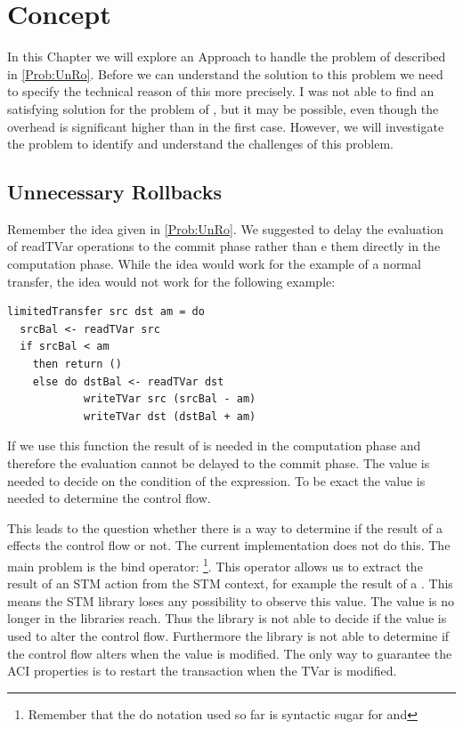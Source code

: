 
\chapter{Concept} %

\label{Chapter2} %

In this Chapter we will explore an Approach to handle the problem of  described in \ref{Prob:UnRo}.
Before we can understand the solution to this problem we need to specify the technical reason of this more precisely. 
I was not able to find an satisfying solution for the problem of , but it may 
be possible, even though the overhead is significant higher than in the first case. However, we will investigate 
the problem to identify and understand the challenges of this problem.

\section{Unnecessary Rollbacks}
Remember the idea given in \ref{Prob:UnRo}. We suggested to delay the evaluation of 
readTVar operations to the commit phase rather than e them directly in the computation
phase. While the idea would work for the example of a normal transfer, the idea would not work 
for the following example:
\begin{lstlisting}
limitedTransfer src dst am = do 
  srcBal <- readTVar src
  if srcBal < am
    then return ()
    else do dstBal <- readTVar dst
            writeTVar src (srcBal - am)
            writeTVar dst (dstBal + am)
\end{lstlisting}
If we use this function the result of  is needed in the computation phase and therefore 
the evaluation cannot be delayed to the commit phase. The value is needed to decide on the condition of the 
 expression. To be exact the value is needed to determine the control flow. 

This leads to the question whether there is a way to determine if the result of a  effects the 
control flow or not. The current implementation does not do this. The main problem is the bind
operator: \footnote{Remember that the do notation used so far is 
syntactic sugar for \code{>>=} and \code{>>}}. This operator allows us to extract the result of an STM action 
from the STM context, for example the result of a . This means the STM library loses any possibility to 
observe this value. The value is no longer in the libraries reach. Thus the library is not able to decide if 
the value is used to alter the control flow. Furthermore the library is not able to determine if the control
flow alters when the value is modified. The only way to guarantee the ACI properties is to restart the 
transaction when the TVar is modified. 

